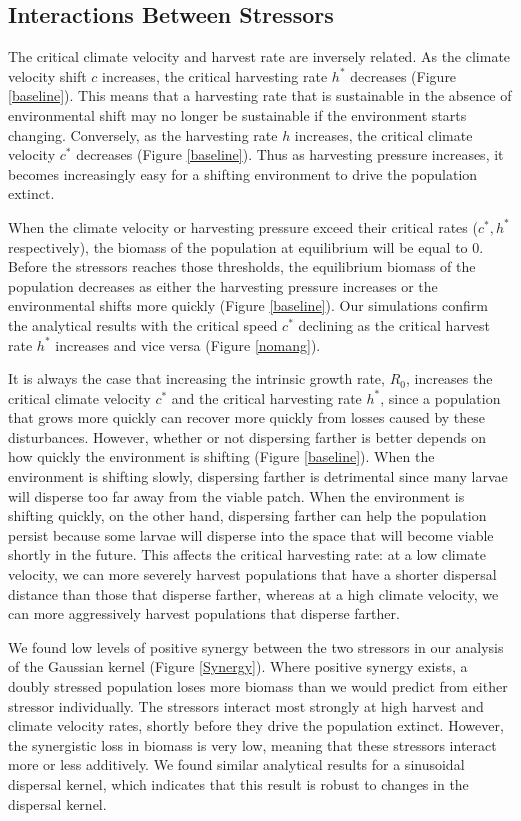 \documentclass[12pt,english]{article}
\begin{document}
\begin{spacing}{1.9}
\begin{flushleft}
\subsection{Interactions Between Stressors }
The critical climate velocity and harvest  rate are inversely related.  As the climate velocity shift $c$ increases, the critical harvesting rate $h^*$ decreases (Figure  \ref{baseline}). This means that a harvesting rate that is sustainable in the absence of environmental shift may no longer be sustainable if the environment starts changing. Conversely, as the harvesting rate $h$ increases, the critical climate velocity $c^*$ decreases (Figure \ref{baseline}).  Thus as harvesting pressure increases, it becomes increasingly easy for a shifting environment to drive the population extinct.

When the climate velocity or harvesting pressure exceed their critical rates ($c^*, h^*$ respectively), the biomass of the population at equilibrium will be equal to $0$.  Before the stressors reaches those thresholds, the equilibrium biomass of the population decreases as either the harvesting pressure increases or the environmental shifts more quickly (Figure \ref{baseline}). Our simulations confirm the analytical results with the critical speed $c^*$ declining as the critical harvest rate $h^*$ increases and vice versa (Figure \ref{nomang}).

It is always the case that increasing the intrinsic growth rate, $R_0$, increases the critical climate velocity $c^*$ and the critical harvesting rate $h^*$, since a population that grows more quickly can recover more quickly from losses caused by these disturbances. However, whether or not dispersing farther is better depends on how quickly the environment is shifting (Figure \ref{baseline}). When the environment is shifting slowly, dispersing farther is detrimental since many larvae will disperse too far away from the viable patch. When the environment is shifting quickly, on the other hand, dispersing farther can help the population persist because some larvae will disperse into the space that will become viable shortly in the future.  This affects the critical harvesting rate: at a low climate velocity, we can more severely harvest populations that have a shorter dispersal distance than those that disperse farther, whereas at a high climate velocity, we can more aggressively harvest populations that disperse farther.

We found low levels of positive synergy between the two stressors in our analysis of the Gaussian kernel (Figure \ref{Synergy}).  Where positive synergy exists, a doubly stressed population loses more biomass than we would predict from either stressor individually.  The stressors interact most strongly at high harvest and climate velocity rates, shortly before they drive the population extinct.  However, the synergistic  loss in biomass is very low, meaning that these stressors interact more or less additively.  We found similar analytical results for a sinusoidal dispersal kernel, which indicates that this result is robust to changes in the dispersal kernel.  


\end{flushleft}
\end{spacing}
\end{document}
